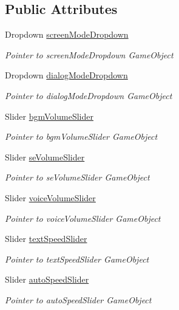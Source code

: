 \subsection*{Public Attributes}
\begin{DoxyCompactItemize}
\item 
Dropdown \hyperlink{class_config_board_manager_ac4c7748ebaccab2a664d2dd8caf4cd19}{screen\+Mode\+Dropdown}
\begin{DoxyCompactList}\small\item\em Pointer to screen\+Mode\+Dropdown Game\+Object \end{DoxyCompactList}\item 
Dropdown \hyperlink{class_config_board_manager_a736234c5393058ed45b77be529292cee}{dialog\+Mode\+Dropdown}
\begin{DoxyCompactList}\small\item\em Pointer to dialog\+Mode\+Dropdown Game\+Object \end{DoxyCompactList}\item 
Slider \hyperlink{class_config_board_manager_a9bc08e2602aca77565d75718cef4c31c}{bgm\+Volume\+Slider}
\begin{DoxyCompactList}\small\item\em Pointer to bgm\+Volume\+Slider Game\+Object \end{DoxyCompactList}\item 
Slider \hyperlink{class_config_board_manager_a6a663883a4487153c8f134c25a16f239}{se\+Volume\+Slider}
\begin{DoxyCompactList}\small\item\em Pointer to se\+Volume\+Slider Game\+Object \end{DoxyCompactList}\item 
Slider \hyperlink{class_config_board_manager_a53f4d8bcf8dc6bb0a03acafacd90875f}{voice\+Volume\+Slider}
\begin{DoxyCompactList}\small\item\em Pointer to voice\+Volume\+Slider Game\+Object \end{DoxyCompactList}\item 
Slider \hyperlink{class_config_board_manager_a09332ad0a9411f6063ff5a9adf602377}{text\+Speed\+Slider}
\begin{DoxyCompactList}\small\item\em Pointer to text\+Speed\+Slider Game\+Object \end{DoxyCompactList}\item 
Slider \hyperlink{class_config_board_manager_ae3d91aa8030f55ac2decbc34d69f2b12}{auto\+Speed\+Slider}
\begin{DoxyCompactList}\small\item\em Pointer to auto\+Speed\+Slider Game\+Object \end{DoxyCompactList}\end{DoxyCompactItemize}


